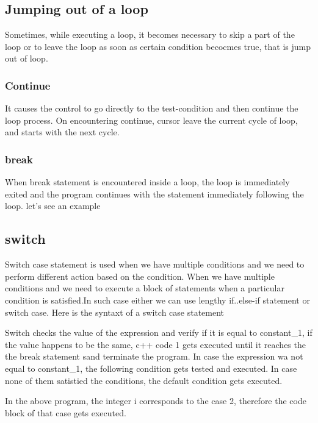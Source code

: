 \documentclass[11pt, a4paper]{article}
\begin{document}
\subsection{Jumping out of a loop}
Sometimes, while executing a loop, it becomes necessary to skip a part of the loop or to leave
the loop as soon as certain condition becocmes true, that is jump out of loop.

\subsubsection{Continue}
It causes the control to go directly to the test-condition and then continue the loop process.
On encountering continue, cursor leave the current cycle of loop, and starts with the next cycle.


\subsubsection{break}
When break statement is encountered inside a loop, the loop is immediately exited and the program
continues with the statement immediately following the loop. let's see an example


\subsection{switch}
Switch case statement is used when we have multiple conditions and we need to perform different
action based on the condition. When we have multiple conditions and we need to execute a block of
statements when a particular condition is satisfied.In such case either we can use lengthy
if..else-if statement or switch case. Here is the syntaxt of a switch case statement

Switch checks the value of the expression and verify if it is equal to constant\_1, if the value happens
to be the same, c++ code 1 gets executed until it reaches the the break statement sand terminate the
program. In case the expression wa not equal to constant\_1, the following condition gets tested
and executed. In case none of them satistied the conditions, the default condition gets executed.

In the above program, the integer i corresponds to the case 2, therefore the code block of that
case gets executed.
\end{document}

